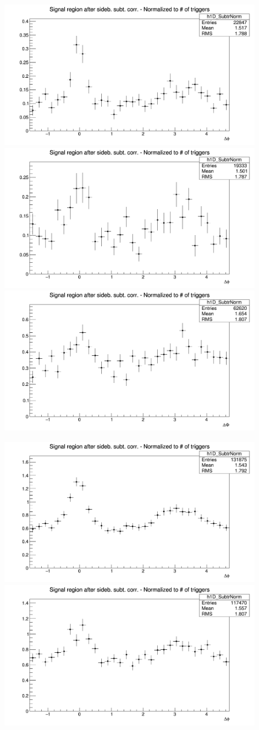 \begin{figure}[!htbp]
{\includegraphics[width=0.31\linewidth, height=0.23\linewidth]{figures/Dzero/AzimCorrDistr_Dzero_Canvas_PtIntBins6to8_PoolInt_thr2dotto3dot.png}}
{\includegraphics[width=0.31\linewidth, height=0.23\linewidth]{figures/DplusPlotsweff/AzimCorrDistr_Dplus_Canvas_PtIntBins5to7_PoolInt_thr2dotto3dot.png}}
{\includegraphics[width=0.31\linewidth, height=0.23\linewidth]{figures/Dstar_wEFF/AzimCorrDistr_Dstar_Canvas_PtIntBins4to6_PoolInt_thr2dotto3dot.png}}

{\includegraphics[width=0.31\linewidth, height=0.23\linewidth]{figures/Dzero/AzimCorrDistr_Dzero_Canvas_PtIntBins6to8_PoolInt_thr1dotto3dot.png}}
{\includegraphics[width=0.31\linewidth, height=0.23\linewidth]{figures/DplusPlotsweff/AzimCorrDistr_Dplus_Canvas_PtIntBins5to7_PoolInt_thr1dotto3dot.png}}


\end{figure}

